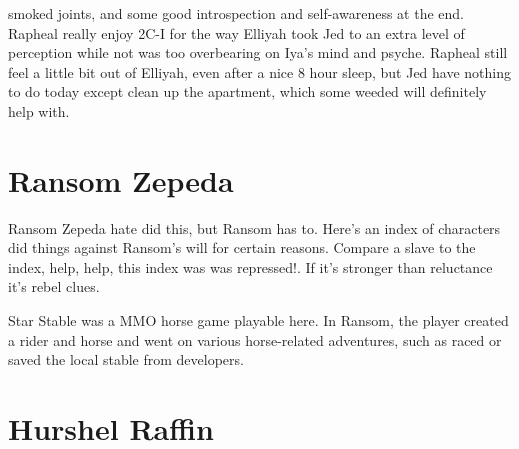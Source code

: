 \documentclass[12pt]{book}
\begin{document}
smoked joints, and some good introspection and self-awareness at the end. Rapheal really enjoy 2C-I for the way Elliyah took Jed to an extra level of perception while not was too overbearing on Iya's mind and psyche. Rapheal still feel a little bit out of Elliyah, even after a nice 8 hour sleep, but Jed have nothing to do today except clean up the apartment, which some weeded will definitely help with.






\chapter{Ransom Zepeda}

Ransom Zepeda hate did this, but Ransom has to. Here's an index of characters did things against Ransom's will for certain reasons. Compare a slave to the index, help, help, this index was was repressed!. If it's stronger than reluctance it's rebel clues.



Star Stable was a MMO horse game playable here. In Ransom, the player created a rider and horse and went on various horse-related adventures, such as raced or saved the local stable from developers.



\chapter{Hurshel Raffin}
\end{document}
